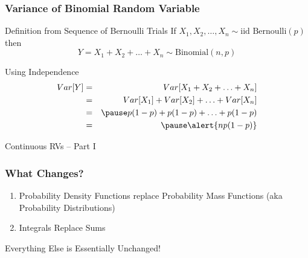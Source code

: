 \documentclass[handout]{beamer}
\begin{document}
\begin{frame}
\frametitle{Variance of Binomial Random Variable}
\begin{block}{Definition from Sequence of Bernoulli Trials}
If $X_1, X_2, \hdots, X_n \sim \mbox{iid Bernoulli}(p)$ then 
	$$Y = X_1 + X_2 + \hdots + X_n \sim \mbox{Binomial}(n,p)$$
\end{block}

\alert{Using Independence}
\begin{eqnarray*}
Var[Y] &=&  Var[X_1 + X_2 + \hdots + X_n]\\
	&=& Var[X_1] + Var[X_2] + \hdots +Var[X_n]\\
	&=&\pause p(1-p) + p(1-p) + \hdots + p(1-p)\\
	&=& \pause \alert{np(1-p)}
\end{eqnarray*}
\vspace{3em}
\end{frame}
\begin{frame}

\centering \Huge Continuous RVs -- Part I

\end{frame}

\begin{frame}
\frametitle{What Changes?}
	\begin{enumerate}
\item Probability Density Functions replace Probability Mass Functions (aka Probability Distributions)
\item Integrals Replace Sums
\end{enumerate}
\begin{alertblock}{Everything Else is Essentially Unchanged!}\end{alertblock}


\end{frame}

\end{document}
